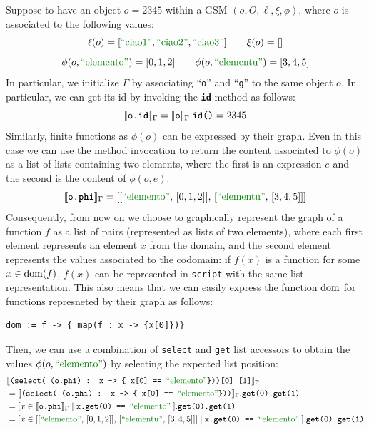 \begin{example}
	Suppose to have an object $o = 2345$ within a GSM $(o,O,\ell,\xi,\phi)$, where $o$ is associated to the following values:
	\[\ell(o) = [\mstr{ciao1},\mstr{ciao2},\mstr{ciao3}]\qquad \xi(o) = []\]
	\[\phi(o,\mstr{elemento})=[0,1,2]\qquad
	\phi(o,\mstr{elementu})=[3,4,5]\]
	In particular, we initialize $\Gamma$ by associating ``\texttt{o}'' and ``\texttt{g}'' to the same object $o$. In particular, we can get its id by invoking the \texttt{\textbf{id}} method as follows:
	\[[\! [\texttt{o.\textbf{id}}]\!]_\Gamma=[\! [\texttt{o}]\!]_\Gamma.\texttt{\textbf{id}()}=2345\]
	Similarly, finite functions as $\phi(o)$ can be expressed by their graph. Even in this case we can use the method invocation to return the content associated to $\phi(o)$ as a list of lists containing two elements, where the first is an expression $e$ and the second is the content of $\phi(o,e)$.
	\[\jsem{\texttt{o.\textbf{phi}}}_\Gamma=[[\mstr{elemento},\, [0,1,2]],\,[\mstr{elementu},\, [3,4,5]]]\]
	Consequently, from now on we choose to graphically represent the graph of a function $f$ as a list of pairs (represented as lists of two elements), where each first element represents an element $x$ from the domain, and the second element represents the values associated to the codomain: if $f(x)$ is a function for some $x\in\operatorname{dom}(f)$, $f(x)$ can be represented in \texttt{script} with the same list representation. This also means that we can easily express the function $\operatorname{dom}$ for functions represneted by their graph as follows:
\begin{lstlisting}[language=Script]
dom := f -> { map(f : x -> {x[0]})}
\end{lstlisting}
	Then, we can use a combination of \texttt{select} and \texttt{get} list accessors to obtain the values $\phi(o,\mstr{elemento})$ by selecting the expected list position:
	\begin{align*}
	&\jsem{\texttt{(select( (o.\textbf{phi}) : x -> \{ x[0] == }\mstr{elemento}\texttt{\}))[0] [1]}}_\Gamma\\
	&= \jsem{\texttt{(select( (o.\textbf{phi}) : x -> \{ x[0] == }\mstr{elemento}\texttt{\}))}}_\Gamma.\texttt{\textbf{get}(0).\textbf{get}(1)}\\
	&= {[x \in \jsem{\texttt{o.\textbf{phi}}}_\Gamma\;|\;{\texttt{x.\textbf{get}(0) == }\mstr{elemento}}\;]}.\texttt{\textbf{get}(0).\textbf{get}(1)}\\
	&= {[x \in [[\mstr{elemento},\, [0,1,2]],\,[\mstr{elementu},\, [3,4,5]]]\;|\;{\texttt{x.\textbf{get}(0) == }\mstr{elemento}}\;]}.\texttt{\textbf{get}(0).\textbf{get}(1)}\\

\end{align*}
\end{example}
